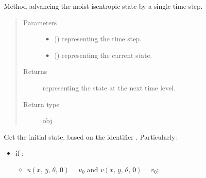 \documentclass[letterpaper,10pt,english]{sphinxmanual}
\begin{document}
\begin{fulllineitems}
\begin{fulllineitems}
\label{\detokenize{api:dycore.dycore_isentropic.DynamicalCoreIsentropic._integrate_moist}}
Method advancing the moist isentropic state by a single time step.
\begin{quote}\begin{description}
\item[{Parameters}] \leavevmode\begin{itemize}
\item {} 
 () \textendash{}  representing the time step.

\item {} 
 () \textendash{} {\hyperref[\detokenize{api:storages.state_isentropic.StateIsentropic}]{}} representing the current state.

\end{itemize}

\item[{Returns}] \leavevmode
{\hyperref[\detokenize{api:storages.state_isentropic.StateIsentropic}]{}} representing the state at the next time level.

\item[{Return type}] \leavevmode
obj

\end{description}\end{quote}

\end{fulllineitems}


\begin{fulllineitems}
\label{\detokenize{api:dycore.dycore_isentropic.DynamicalCoreIsentropic.get_initial_state}}
Get the initial state, based on the identifier . Particularly:
\begin{itemize}
\item {} 
if :
\begin{itemize}
\item {} 
\(u(x, \, y, \, \theta, \, 0) = u_0\) and \(v(x, \, y, \, \theta, \, 0) = v_0\);


\end{itemize}
\end{itemize}
\end{fulllineitems}
\end{fulllineitems}
\end{document}
